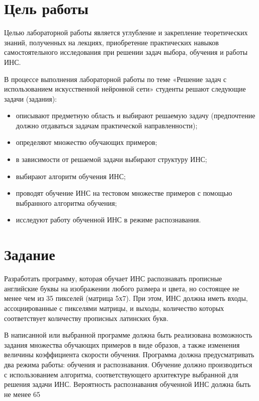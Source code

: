 \documentclass[russian,utf8,emptystyle]{eskdtext}
\begin{document}
\maketitle
\tableofcontents
\newpage

\pagestyle{plain}

\section{Цель работы}
Целью лабораторной работы является углубление и закрепление теоретических знаний, полученных на лекциях, приобретение практических навыков самостоятельного исследования при решении задач выбора, обучения и работы ИНС.

В процессе выполнения лабораторной работы по теме «Решение задач с использованием искусственной нейронной сети» студенты решают следующие задачи (задания):
\begin{itemize}
\item описывают предметную область и выбирают решаемую задачу (предпочтение должно отдаваться задачам практической направленности);
\item определяют множество обучающих примеров;
\item в зависимости от решаемой задачи выбирают структуру ИНС;
\item выбирают алгоритм обучения ИНС;
\item проводят обучение ИНС на тестовом множестве примеров с помощью выбранного алгоритма обучения;
\item исследуют работу обученной ИНС в режиме распознавания.
\end{itemize}

\section{Задание}

Разработать программу, которая обучает ИНС распознавать прописные английские буквы на изображении любого размера и цвета, но состоящее не менее чем из 35 пикселей (матрица 5х7). При этом, ИНС должна иметь входы, ассоциированные с пикселями матрицы, и выходы, количество которых соответствует количеству прописных латинских букв.

В написанной или выбранной программе должна быть реализована возможность задания множества обучающих примеров в виде образов, а также изменения величины коэффициента скорости обучения. Программа должна предусматривать два режима работы: обучения и распознавания. Обучение должно производиться с использованием алгоритма, соответствующего архитектуре выбранной для решения задачи ИНС. Вероятность распознавания обученной ИНС должна быть не менее 65%
\end{document}
